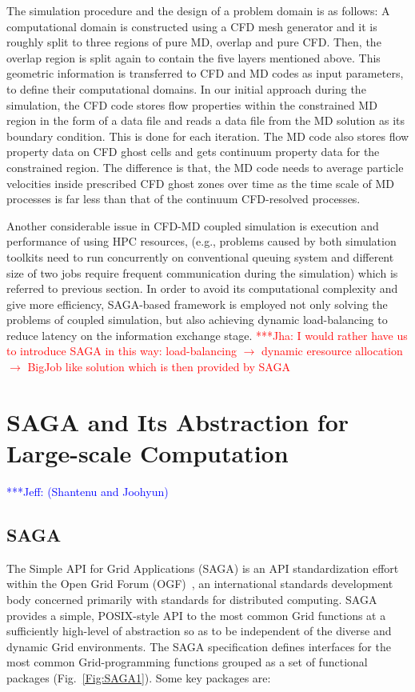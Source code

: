 \documentclass[conference,final]{IEEEtran}
\newcommand{\jhanote}[1]{ {\textcolor{red} { ***Jha: #1 }}}
\newcommand{\Nkimnote}[1]{ {\textcolor{green} { ***Nkim: #1 }}}
\newcommand{\skonote}[1]{ {\textcolor{blue} { ***Jeff: #1 }}}
\newcommand{\jhanote}[1]{}
\newcommand{\Nkimnote}[1]{}
\newcommand{\skonote}[1]{}
\begin{document}
The simulation procedure and the design of a problem domain is as follows: A computational domain is constructed using a CFD mesh generator and it is roughly split to three regions of pure MD, overlap and pure CFD. Then, the overlap region is split again to contain the five layers mentioned above. This geometric information is transferred to CFD and MD codes as input parameters, to define their computational domains. In our initial approach during the simulation, the CFD code stores flow properties within the constrained MD region in the form of a data file and reads a data file from the MD solution as its boundary condition. This is done for each iteration. The MD code also stores flow property data on CFD ghost cells and gets continuum property data for the constrained region. The difference is that, the MD code needs to average particle velocities inside prescribed CFD ghost zones over time as the time scale of MD processes is far less than that of the continuum CFD-resolved processes. 

Another considerable issue in CFD-MD coupled simulation is execution and performance of using HPC resources, (e.g., problems caused by both simulation toolkits need to run concurrently on conventional queuing system and different size of two jobs require frequent communication during the simulation) which is referred to previous section. In order to avoid its computational complexity and give more efficiency, SAGA-based framework is employed not only solving the problems of coupled simulation, but also achieving dynamic load-balancing to reduce latency on the information exchange stage. 
\jhanote{I would rather have us to introduce SAGA in this way: load-balancing $\rightarrow$ dynamic eresource allocation $\rightarrow$ BigJob like solution which is then provided by SAGA} 

\section{SAGA and Its Abstraction for Large-scale Computation}
\skonote{(Shantenu and Joohyun)}

\subsection{SAGA}

The Simple API for Grid Applications (SAGA) is an API standardization effort within the Open Grid Forum (OGF)~\cite{ogf_web}, an international standards development body concerned primarily with standards for distributed computing.  SAGA provides a simple, POSIX-style API to the most common Grid functions at a sufficiently high-level of abstraction so as to be %
independent of the diverse and dynamic Grid environments. The SAGA specification defines interfaces for the most common Grid-programming functions grouped as a set of functional packages (Fig.~\ref{Fig:SAGA1}).  Some key packages are:
\end{document}
